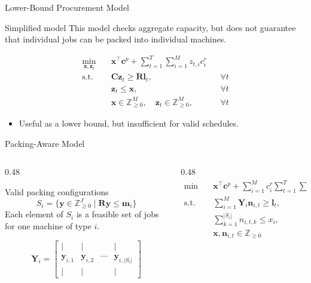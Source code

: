 \documentclass[aspectratio=169,10pt]{beamer}
\newcommand{\R}{\mathbf{R}}
\newcommand{\C}{\mathbf{C}}
\newcommand{\cp}{\mathbf{c}^{p}}
\newcommand{\x}{\mathbf{x}}
\newcommand{\zt}{\mathbf{z}_{t}}
\newcommand{\lt}{\mathbf{l}_{t}}
\begin{document}
\begin{frame}{Lower-Bound Procurement Model}
  \begin{block}{Simplified model}
    This model checks aggregate capacity, but does not guarantee that individual jobs can be packed into individual machines.
  \end{block}
  \begin{align*}
    \min_{\x,\zt}\quad
      & \x^\top\cp + \sum_{t=1}^{T}\sum_{i=1}^{M} z_{t,i}c_i^r\\
    \text{s.t.}\quad
      & \C\zt \geq \R\lt, && \forall t\\
      & \zt \leq \x, && \forall t\\
      & \x \in \mathbb{Z}_{\geq 0}^{M},\quad
        \zt \in \mathbb{Z}_{\geq 0}^{M}, && \forall t
  \end{align*}
  \vspace{-0.1cm}
  \begin{itemize}
    \item Useful as a lower bound, but insufficient for valid schedules.
  \end{itemize}
\end{frame}

\begin{frame}{Packing-Aware Model}
  \begin{columns}[T,totalwidth=\textwidth]
    \begin{column}{0.48\textwidth}
      \begin{block}{Valid packing configurations}
        \[
          S_i = \{\mathbf{y}\in\mathbb{Z}_{\geq 0}^{J}\mid \R\mathbf{y}\leq\mathbf{m}_i\}
        \]
        Each element of $S_i$ is a feasible set of jobs for one machine of type $i$.
      \end{block}
      \[
        \mathbf{Y}_i =
        \begin{bmatrix}
          | & | & & |\\
          \mathbf{y}_{i,1} & \mathbf{y}_{i,2} & \cdots & \mathbf{y}_{i,|S_i|}\\
          | & | & & |
        \end{bmatrix}
      \]
    \end{column}
    \begin{column}{0.48\textwidth}
      \begin{align*}
        \min\quad
          & \x^\top\cp
          + \sum_{i=1}^{M} c_i^r
            \sum_{t=1}^{T}\sum_{k=1}^{|S_i|} n_{i,t,k}\\
        \text{s.t.}\quad
          & \sum_{i=1}^{M}\mathbf{Y}_i\mathbf{n}_{i,t} \geq \lt,
          && \forall t\\
          & \sum_{k=1}^{|S_i|} n_{i,t,k} \leq x_i,
          && \forall i,t\\
          & \x,\mathbf{n}_{i,t}\in\mathbb{Z}_{\geq 0}
      \end{align*}
    \end{column}
  \end{columns}
\end{frame}
\end{document}
